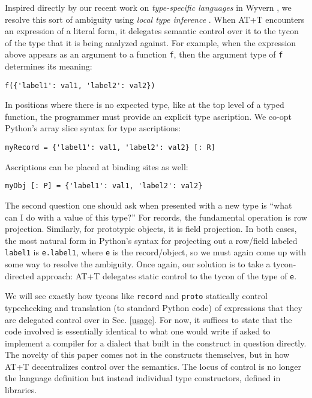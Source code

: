 \documentclass{sigplanconf}
\newcommand{\lip}[1]{\lstinline[language=Python,basicstyle=\ttfamily\small,deletendkeywords={tuple,buffer,map}]{#1}}
\begin{document}
Inspired directly by our recent work on \emph{type-specific languages} in Wyvern \cite{TSLs}, we resolve this sort of ambiguity using \emph{local type inference} \cite{Pierce:2000:LTI:345099.345100}. When AT+T encounters an expression  of a literal form, it delegates semantic control over it to the tycon of the type that it is being analyzed against. For example, when the expression above appears as an argument to a function \lip{f}, then the argument type of \lip{f} determines its meaning:
\begin{lstlisting}[numbers=none]
f({'label1': val1, 'label2': val2})
\end{lstlisting}
 In positions where there is no expected type, like at the top level of a typed function, the programmer must provide an explicit type ascription. We co-opt Python's array slice syntax for type ascriptions:
\begin{lstlisting}[numbers=none]
myRecord = {'label1': val1, 'label2': val2} [: R]
\end{lstlisting}
Ascriptions can be placed at binding sites as well:
\begin{lstlisting}[numbers=none]
myObj [: P] = {'label1': val1, 'label2': val2}
\end{lstlisting}

The second question one should ask when presented with a new type is ``what can I do with a value of this type?'' For records, the fundamental operation is row projection. Similarly, for prototypic objects, it is field projection. In both cases, the most natural form in Python's syntax for projecting out a row/field labeled \lip{label1} is \lip{e.label1}, where \lip{e} is the record/object, so we must again come up with some way to resolve the ambiguity. Once again, our solution is to take a {tycon-directed} approach: AT+T delegates static control to  the tycon of the type of \lip{e}. %

We will see exactly how  tycons like \lip{record} and \lip{proto} statically control typechecking and translation (to standard Python code) of expressions that they are delegated control over in Sec. \ref{usage}. For now, it suffices to state that the code involved is essentially identical to what one would write if asked to implement a compiler for a dialect that built in the construct in question directly. The novelty of this paper comes not in the constructs themselves, but in how AT+T decentralizes control over the semantics. The locus of control is no longer the language definition but instead individual type constructors, defined in libraries.
\end{document}
